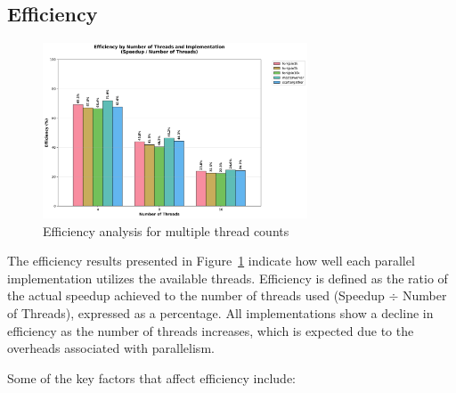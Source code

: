 \newpage

\subsection{Efficiency}

\begin{figure}[htbp]
   \centering
   \includegraphics[width=0.7\textwidth]{images/efficiency_analysis.png}
   \caption{Efficiency analysis for multiple thread counts}
   \label{fig:efficiency}
\end{figure}

The efficiency results presented in Figure~\ref{fig:efficiency} indicate how well
each parallel implementation utilizes the available threads. Efficiency is defined
as the ratio of the actual speedup achieved to the number of threads used
(Speedup $\div$ Number of Threads), expressed as a percentage.
All implementations show a decline in efficiency as the number of threads
increases, which is expected due to the overheads associated with parallelism.

Some of the key factors that affect efficiency include:

